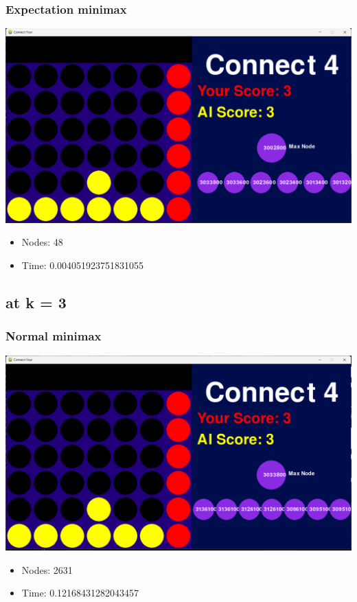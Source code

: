 \documentclass{article}
\begin{document}
\subsubsection*{Expectation minimax}
\begin{center}
    \includegraphics[width=0.8\linewidth]{testcase.png}
\end{center}
\begin{itemize}
    \item Nodes: 48
    \item Time: 0.004051923751831055
\end{itemize}
\subsection*{at k = 3}
\subsubsection*{Normal minimax}
\begin{center}
    \includegraphics[width=0.8\linewidth]{testcase3.png}
\end{center}
\begin{itemize}
    \item Nodes: 2631
    \item Time: 0.12168431282043457
\end{itemize}
\end{document}

